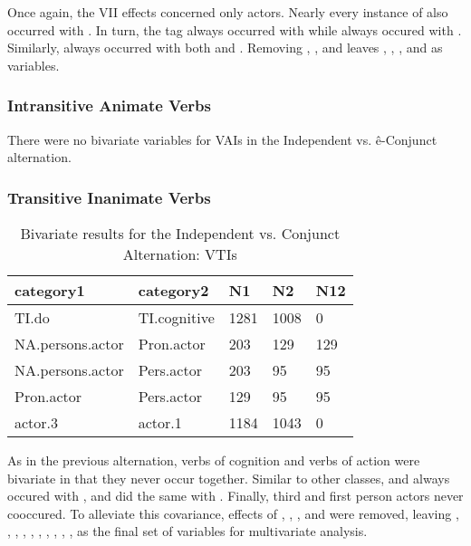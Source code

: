 Once again, the VII effects concerned only actors. Nearly every instance of  also occurred with . In turn, the  tag always occurred with  while  always occured with . Similarly,  always occurred with both  and . Removing , , and  leaves , , , and  as variables.
\FloatBarrier

\FloatBarrier

\subsubsection{Intransitive Animate Verbs}

There were no bivariate variables for VAIs in the Independent vs. ê-Conjunct alternation.

\FloatBarrier

\FloatBarrier

\subsubsection{Transitive Inanimate Verbs}

\begin{table}[H]
\centering
\begin{tabular}{lllll}
\toprule
category1        & category2  & N1   & N2   & N12 \\
\midrule
TI.do & TI.cognitive & 1281 & 1008 & 0 \\
NA.persons.actor & Pron.actor & 203 & 129 & 129 \\
NA.persons.actor & Pers.actor & 203 & 95 & 95 \\
Pron.actor & Pers.actor & 129 & 95 & 95 \\
actor.3 & actor.1 & 1184 & 1043 & 0 \\
\bottomrule
\end{tabular}
\caption{
   Bivariate results for the Independent vs. Conjunct Alternation: VTIs \\ \label{tab:ticnjuni}
  }
\end{table}

As in the previous alternation, verbs of cognition and verbs of action were bivariate in that they never occur together. Similar to other classes,  and  always occured with , and  did the same with . Finally, third and first person actors never cooccured. To alleviate this covariance, effects of , , , and  were removed, leaving , , , , , , , , , ,  as the final set of variables for multivariate analysis. 

